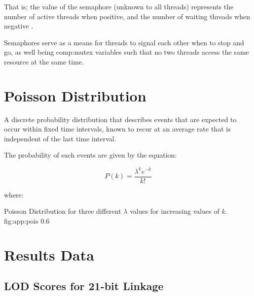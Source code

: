 That is; the value of the semaphore (unknown to all threads) represents the number of active threads when positive, and the number of waiting threads when negative \cite{downey_little_2005}.

Semaphores serve as a means for threads to signal each other when to stop and go, as well being \gls{comp:mutex} variables such that no two threads access the same resource at the same time.






\section{Poisson Distribution}\label{ref:app:poisson}

A discrete probability distribution that describes events that are expected to occur within fixed time intervals, known to recur at an average rate that is independent of the last time interval.

The probability of such events are given by the equation:

\begin{equation}
P(k) = \frac{\lambda^k e^{-k}}{k!}
\end{equation}

\begin{spacing}{1}
where:
\begin{description}
\end{description}
\end{spacing}


{Poisson Distribution for three different $\lambda$ values for increasing values of \textit{k}.}
{fig:app:pois}
{0.6}



\pagebreak
\section{Results Data}

\subsection{LOD Scores for 21-bit Linkage}
\label{ref:app:21bitscores}

